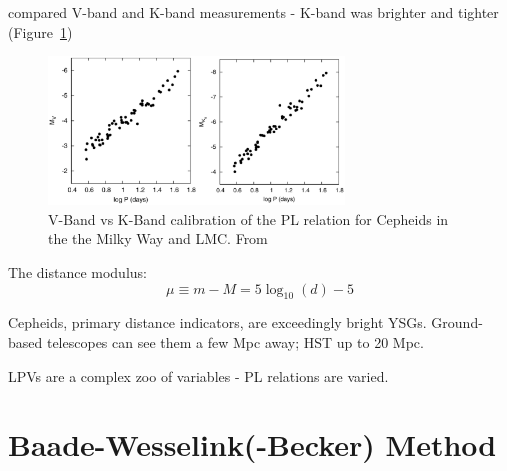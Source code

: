 \documentclass{spy}
\begin{document}
\citet{fouqueNewCalibrationGalactic2007} compared V-band and K-band measurements - K-band was brighter and tighter (Figure~\ref{fouque_cepheid})

\begin{figure}[ht]
    \centering
    \includegraphics[width=0.7\textwidth]{fouque_cepheid.eps}
    \caption{V-Band vs K-Band calibration of the PL relation for Cepheids in the the Milky Way and LMC. From \citet{fouqueNewCalibrationGalactic2007}}   
    \label{fouque_cepheid}
\end{figure}

The distance modulus:
\begin{equation}
\mu \equiv m-M = 5\log_\mathrm{10}(d) - 5
\end{equation}

Cepheids, primary distance indicators, are exceedingly bright YSGs. Ground-based telescopes can see them a few Mpc away; HST up to 20 Mpc. 

LPVs are a complex zoo of variables - PL relations are varied. 

\section{Baade-Wesselink(-Becker) Method}
\end{document}
